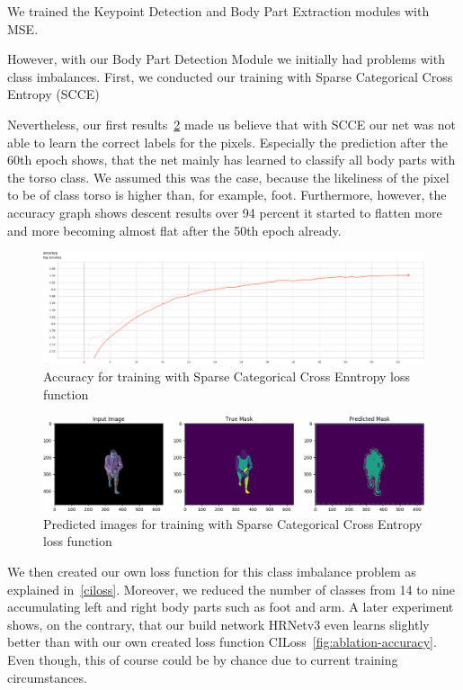 We trained the Keypoint Detection and Body Part Extraction modules with MSE.

However, with our Body Part Detection Module we initially had problems with class imbalances.
First, we conducted our training with Sparse Categorical Cross Entropy (SCCE)


Nevertheless, our first results~\ref{fig:cross_entropy_pred_img} made us believe that with SCCE our net was not able to
learn the correct labels for the pixels.
Especially the prediction after the 60th epoch shows, that the net mainly has learned to classify all body parts with the
torso class.
We assumed this was the case, because the likeliness of the pixel to be of class torso is higher than, for
example, foot.
Furthermore, however, the accuracy graph shows descent results over 94 percent it started to flatten more and more becoming
almost flat after the 50th epoch already.
\begin{figure}[H]
    \centering
    \includegraphics[width=\textwidth,height=\textheight,keepaspectratio]{Figures/accuracy_cross_entropy.png}
    \decoRule
    \caption[Loss Functions SCCE: Accuracy]{Accuracy for training with Sparse Categorical Cross Enntropy loss function}
    \label{fig:accuracy_cross_entropy}
\end{figure}
\begin{figure}[H]
    \centering
    \includegraphics[width=\textwidth,height=\textheight,keepaspectratio]{Figures/crossentropy_imgs_prediction_last_epoch.png}
    \decoRule
    \caption[Loss Functions SCCE: predictions]{Predicted images for training with Sparse Categorical Cross Entropy loss function}
    \label{fig:cross_entropy_pred_img}
\end{figure}
We then created our own loss function for this class imbalance problem as explained in~\autoref{ciloss}.
Moreover, we reduced the number of classes from 14 to nine accumulating left and right body parts such as foot and arm.
A later experiment shows, on the contrary, that our build network HRNetv3 even learns slightly better than with our own created
loss function CILoss~\ref{fig:ablation-accuracy}.
Even though, this of course could be by chance due to current training circumstances.


